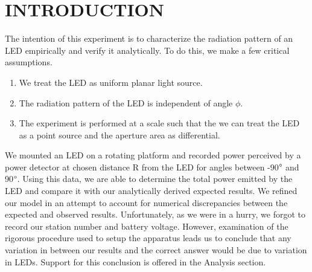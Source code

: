 \section{INTRODUCTION}
The intention of this experiment is to characterize the radiation pattern of an LED empirically and verify it analytically. To do this, we make a few critical assumptions.
\begin{enumerate}
\item We treat the LED as uniform planar light source.
\item The radiation pattern of the LED is independent of angle $\phi$.
\item The experiment is performed at a scale such that the we can treat the LED as a point source and the aperture area as differential.
\end{enumerate}

We mounted an LED on a rotating platform and recorded power perceived by a power detector at chosen distance R from the LED for angles between -90$\degree$ and 90$\degree$. Using this data, we are able to determine the total power emitted by the LED and compare it with our analytically derived expected results. We refined our model in an attempt to account for numerical discrepancies between the expected and observed results. Unfortunately, as we were in a hurry, we forgot to record our station number and battery voltage. However, examination of the rigorous procedure used to setup the apparatus leads us to conclude that any variation in between our results and the correct answer would be due to variation in LEDs. Support for this conclusion is offered in the Analysis section.